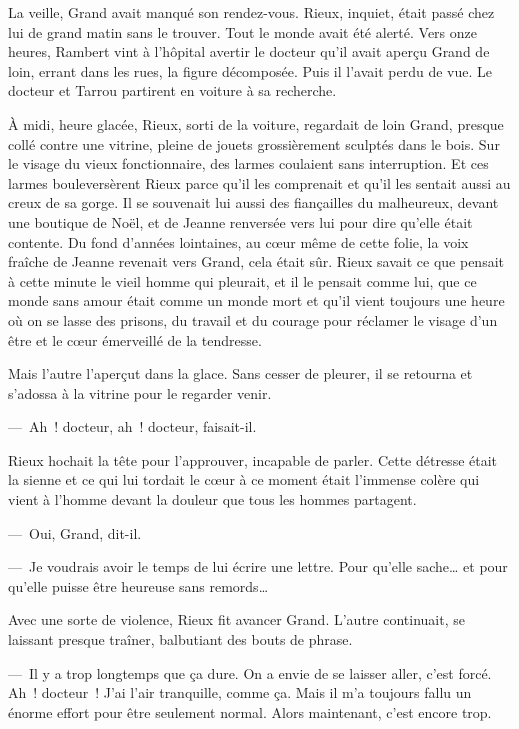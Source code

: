 \documentclass[french,twoside]{book} %
\begin{document}
La veille, Grand avait manqué son rendez-vous. Rieux, inquiet, était passé chez lui de grand matin sans le trouver. Tout le monde avait été alerté. Vers onze heures, Rambert vint à l’hôpital avertir le docteur qu’il avait aperçu Grand de loin, errant dans les rues, la figure décomposée. Puis il l’avait perdu de vue. Le docteur et Tarrou partirent en voiture à sa recherche.\par
À midi, heure glacée, Rieux, sorti de la voiture, regardait de loin Grand, presque collé contre une vitrine, pleine de jouets grossièrement sculptés dans le bois. Sur le visage du vieux fonctionnaire, des larmes coulaient sans interruption. Et ces larmes bouleversèrent Rieux parce qu’il les comprenait et qu’il les sentait aussi au creux de sa gorge. Il se souvenait lui aussi des fiançailles du malheureux, devant une boutique de Noël, et de Jeanne renversée vers lui pour dire qu’elle était contente. Du fond d’années lointaines, au cœur même de cette folie, la voix fraîche de Jeanne revenait vers Grand, cela était sûr. Rieux savait ce que pensait à cette minute le vieil homme qui pleurait, et il le pensait comme lui, que ce monde sans amour était comme un monde mort et qu’il vient toujours une heure où on se lasse des prisons, du travail et du courage pour réclamer le visage d’un être et le cœur émerveillé de la tendresse.\par
Mais l’autre l’aperçut dans la glace. Sans cesser de pleurer, il se retourna et s’adossa à la vitrine pour le regarder venir.\par
— Ah ! docteur, ah ! docteur, faisait-il.\par
Rieux hochait la tête pour l’approuver, incapable de parler. Cette détresse était la sienne et ce qui lui tordait le cœur à ce moment était l’immense colère qui vient à l’homme devant la douleur que tous les hommes partagent.\par
— Oui, Grand, dit-il.\par
— Je voudrais avoir le temps de lui écrire une lettre. Pour qu’elle sache… et pour qu’elle puisse être heureuse sans remords…\par
Avec une sorte de violence, Rieux fit avancer Grand. L’autre continuait, se laissant presque traîner, balbutiant des bouts de phrase.\par
— Il y a trop longtemps que ça dure. On a envie de se laisser aller, c’est forcé. Ah ! docteur ! J’ai l’air tranquille, comme ça. Mais il m’a toujours fallu un énorme effort pour être seulement normal. Alors maintenant, c’est encore trop.\par
\end{document}
